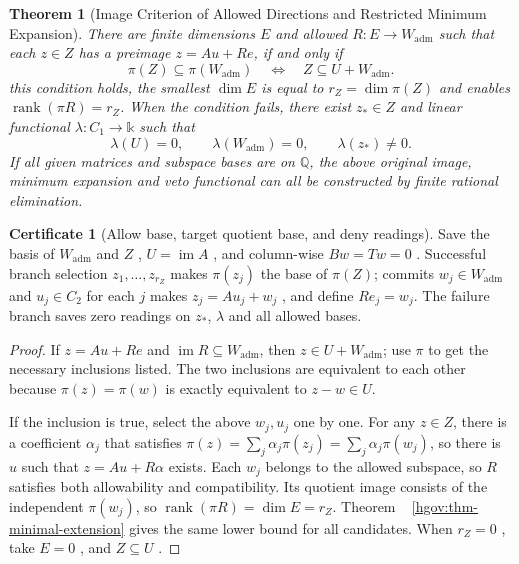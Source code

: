 \documentclass[12pt,a4paper,openany,notitlepage]{report}
\theoremstyle{plain}
\newtheorem{theorem}{Theorem}[chapter]
\theoremstyle{definition}
\newtheorem*{certificate}{Certificate}
\theoremstyle{remark}
\begin{document}
\begin{CJK*}
\begin{theorem}
[Image Criterion of Allowed Directions and Restricted Minimum Expansion]\label{exp:hom:restricted-minimum}
There are finite dimensions $E$ and allowed $R:E\to W_{\mathrm{adm}}$ such that each $z\in Z$ has a preimage $z=Au+Re$, if and only if \[
 \pi(Z)\subseteq\pi(W_{\mathrm{adm}})
 \quad\Longleftrightarrow\quad
 Z\subseteq U+W_{\mathrm{adm}}.
\] this condition holds, the smallest $\dim E$ is equal to $r_Z=\dim\pi(Z)$ and enables $\operatorname{rank}(\pi R)=r_Z$. When the condition fails, there exist $z_*\in Z$ and linear functional $\lambda:C_1\to\mathbb k$ such that \[
 \lambda(U)=0,\qquad
 \lambda(W_{\mathrm{adm}})=0,\qquad
 \lambda(z_*)\ne0.
\] If all given matrices and subspace bases are on $\mathbb Q$, the above original image, minimum expansion and veto functional can all be constructed by finite rational elimination.\end{theorem}
\begin{certificate}
[Allow base, target quotient base, and deny readings]Save the basis of $W_{\mathrm{adm}}$ and $Z$ , $U=\operatorname{im}A$ , and column-wise $Bw=Tw=0$ . Successful branch selection $z_1,\ldots,z_{r_Z}$ makes $\pi(z_j)$ the base of $\pi(Z)$; commits $w_j\in W_{\mathrm{adm}}$ and $u_j\in C_2$ for each $j$ makes $z_j=Au_j+w_j$ , and define $Re_j=w_j$. The failure branch saves zero readings on $z_*$, $\lambda$ and all allowed bases.\end{certificate}
\begin{proof}
If $z=Au+Re$ and $\operatorname{im}R\subseteq W_{\mathrm{adm}}$, then $z\in U+W_{\mathrm{adm}}$; use $\pi$ to get the necessary inclusions listed. The two inclusions are equivalent to each other because $\pi(z)=\pi(w)$ is exactly equivalent to $z-w\in U$.

If the inclusion is true, select the above $w_j,u_j$ one by one. For any $z\in Z$, there is a coefficient $\alpha_j$ that satisfies $\pi(z)=\sum_j\alpha_j\pi(z_j)=\sum_j\alpha_j\pi(w_j)$, so there is $u$ such that $z=Au+R\alpha$ exists. Each $w_j$ belongs to the allowed subspace, so $R$ satisfies both allowability and compatibility. Its quotient image consists of the independent $\pi(w_j)$, so $\operatorname{rank}(\pi R)=\dim E=r_Z$. Theorem ~ \ref{hgov:thm-minimal-extension} gives the same lower bound for all candidates. When $r_Z=0$ , take $E=0$ , and $Z\subseteq U$ .


\end{proof}
\end{CJK*}
\end{document}
